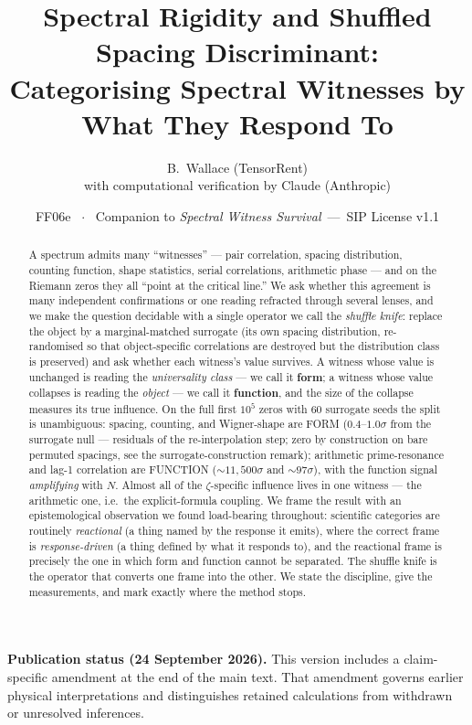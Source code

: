 \documentclass[11pt]{article}
\title{\textbf{Spectral Rigidity and Shuffled Spacing Discriminant:\\
Categorising Spectral Witnesses by What They Respond To}}
\author{B.\ Wallace \quad (TensorRent)\\ \small with computational verification by Claude (Anthropic)}
\date{\small FF06e \ $\cdot$ \ Companion to \textit{Spectral Witness Survival}\ ---\ SIP License v1.1}
\begin{document}
\maketitle

\begin{abstract}
A spectrum admits many ``witnesses'' --- pair correlation, spacing distribution, counting function, shape statistics, serial correlations, arithmetic phase --- and on the Riemann zeros they all ``point at the critical line.'' We ask whether this agreement is many independent confirmations or one reading refracted through several lenses, and we make the question decidable with a single operator we call the \emph{shuffle knife}: replace the object by a marginal-matched surrogate (its own spacing distribution, re-randomised so that object-specific correlations are destroyed but the distribution class is preserved) and ask whether each witness's value survives. A witness whose value is unchanged is reading the \emph{universality class} --- we call it \textbf{form}; a witness whose value collapses is reading the \emph{object} --- we call it \textbf{function}, and the size of the collapse measures its true influence. On the full first $10^5$ zeros with $60$ surrogate seeds the split is unambiguous: spacing, counting, and Wigner-shape are FORM ($0.4$--$1.0\sigma$ from the surrogate null --- residuals of the re-interpolation step; zero by construction on bare permuted spacings, see the surrogate-construction remark); arithmetic prime-resonance and lag-1 correlation are FUNCTION ($\sim\!11{,}500\sigma$ and $\sim\!97\sigma$), with the function signal \emph{amplifying} with $N$. Almost all of the $\zeta$-specific influence lives in one witness --- the arithmetic one, i.e.\ the explicit-formula coupling. We frame the result with an epistemological observation we found load-bearing throughout: scientific categories are routinely \emph{reactional} (a thing named by the response it emits), where the correct frame is \emph{response-driven} (a thing defined by what it responds to), and the reactional frame is precisely the one in which form and function cannot be separated. The shuffle knife is the operator that converts one frame into the other. We state the discipline, give the measurements, and mark exactly where the method stops.
\end{abstract}
\par\smallskip\noindent\textbf{Publication status (24 September 2026).}
This version includes a claim-specific amendment at the end of the main text.
That amendment governs earlier physical interpretations and distinguishes
retained calculations from withdrawn or unresolved inferences.\par\smallskip
\end{document}
